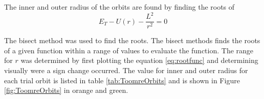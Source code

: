 The inner and outer radius of the orbits are found by finding the roots of
\begin{equation}
    E_T - U(r) - \frac{L^2}{r^2} = 0
    \label{eq:rootfunc}
\end{equation}

The bisect method was used to find the roots. The bisect methods finds the roots of a given function within a range of values to evaluate the function. The range for $r$ was determined by first plotting the equation \ref{eq:rootfunc} and determining visually were a sign change occurred. The value for inner and outer radius for each trial orbit is listed in table \ref{tab:ToomreOrbits} and is shown in Figure \ref{fig:ToomreOrbits} in orange and green. 





